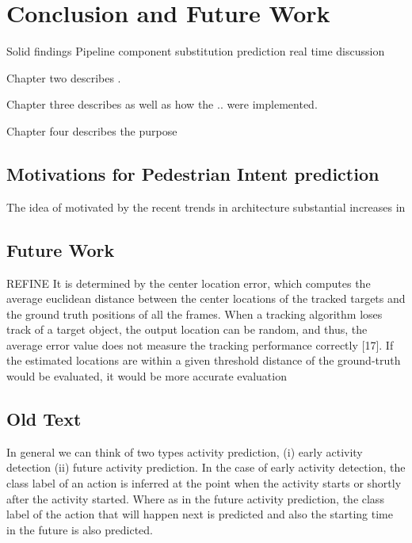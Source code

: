 
\chapter{Conclusion and Future Work}

Solid findings
Pipeline
component substitution
prediction
real time discussion

Chapter two describes .

Chapter three describes as well as how the ..  were implemented.

Chapter four describes the purpose 

\section{Motivations for Pedestrian Intent prediction}

The idea of  motivated by the recent trends in 
architecture 
substantial increases in 

\section{Future Work}
REFINE
It is determined by the center location error, which computes the average
euclidean distance between the center locations of the tracked targets and the ground truth
positions of all the frames. When a tracking algorithm loses track of a target object, the
output location can be random, and thus, the average error value does not measure the
tracking performance correctly [17]. If the estimated locations are within a given threshold
distance of the ground-truth would be evaluated, it would be more accurate evaluation

\section{Old Text}
In general we can think of two types activity prediction, (i) early activity detection (ii) future activity prediction. In the case of early activity detection, the class label of an action is inferred at the point when the activity starts or shortly after the activity started. Where as in the future activity prediction, the class label of the action that will happen next is predicted and also the starting time in the future is also predicted.




